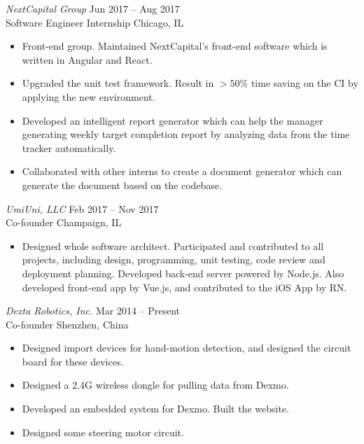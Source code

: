 \documentclass[margin=1in, 10pt]{res} %
\begin{document}
\begin{resume}
{\sl NextCapital Group} \hfill Jun 2017 -- Aug 2017 \\
Software Engineer Internship \hfill Chicago, IL
\vspace{0.05in}
\begin{itemize} \itemsep -2pt
\item Front-end group. Maintained NextCapital's front-end software which is written in Angular and React.
\item Upgraded the unit test framework. Result in $>50\%$ time saving on the CI by applying the new environment.
\item Developed an intelligent report generator which can help the manager generating weekly target completion report by analyzing data from the time tracker automatically.
\item Collaborated with other interns to create a document generator which can generate the document based on the codebase.
\end{itemize}

{\sl UmiUni, LLC} \hfill Feb 2017 -- Nov 2017 \\
Co-founder \hfill Champaign, IL
\vspace{0.05in}
\begin{itemize} \itemsep -2pt %
\item Designed whole software architect. Participated and contributed to all projects, including design, programming, unit testing, code review and deployment planning. Developed back-end server powered by Node.js. Also developed front-end app by Vue.js, and contributed to the iOS App by RN.
\end{itemize}

{\sl Dexta Robotics, Inc.} \hfill Mar 2014 -- Present \\
Co-founder \hfill Shenzhen, China
\vspace{0.05in}
\begin{itemize} \itemsep -2pt %
\item Designed import devices for hand-motion detection, and designed the circuit board for these devices.
\item Designed a 2.4G wireless dongle for pulling data from Dexmo.
\item Developed an embedded system for Dexmo. Built the website.
\item Designed some steering motor circuit.
\end{itemize}



\end{resume}
\end{document}

